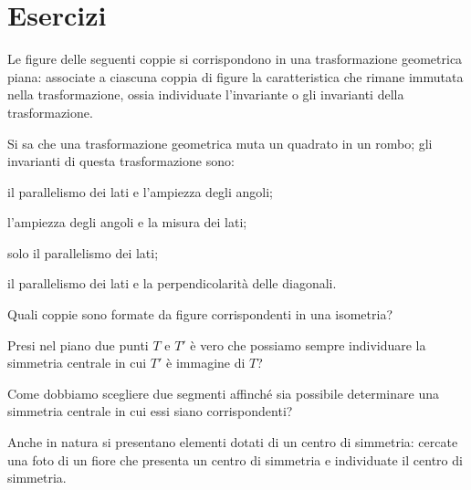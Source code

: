\section{Esercizi}


\begin{esercizio}
\label{ese:8.1}
Le figure delle seguenti coppie si corrispondono in una trasformazione geometrica piana: associate a ciascuna coppia di figure la caratteristica che rimane immutata nella trasformazione, ossia individuate l'invariante o gli invarianti della trasformazione.
\end{esercizio}

\begin{esercizio}
\label{ese:8.2}
Si sa che una trasformazione geometrica muta un quadrato in un rombo; gli invarianti di questa trasformazione sono:
\begin{enumeratea}
\item il parallelismo dei lati e l'ampiezza degli angoli;
\item l'ampiezza degli angoli e la misura dei lati;
\item solo il parallelismo 	dei lati;
\item il parallelismo dei lati e la perpendicolarità delle diagonali.
\end{enumeratea}
\end{esercizio}

\begin{esercizio}
\label{ese:8.3}
Quali coppie sono formate da figure corrispondenti in una isometria?
\end{esercizio}

\begin{esercizio}
\label{ese:8.4}
Presi nel piano due punti $T$ e $T'$ è vero che possiamo sempre individuare la simmetria centrale in cui $T'$ è immagine di $T$?
\end{esercizio}

\begin{esercizio}
\label{ese:8.5}
Come dobbiamo scegliere due segmenti affinché sia possibile determinare una simmetria centrale in cui essi siano corrispondenti?
\end{esercizio}

\begin{esercizio}
\label{ese:8.6}
Anche in natura si presentano elementi dotati di un centro di simmetria: cercate una foto di un fiore che presenta un centro di simmetria e individuate il centro di simmetria.
\end{esercizio}

